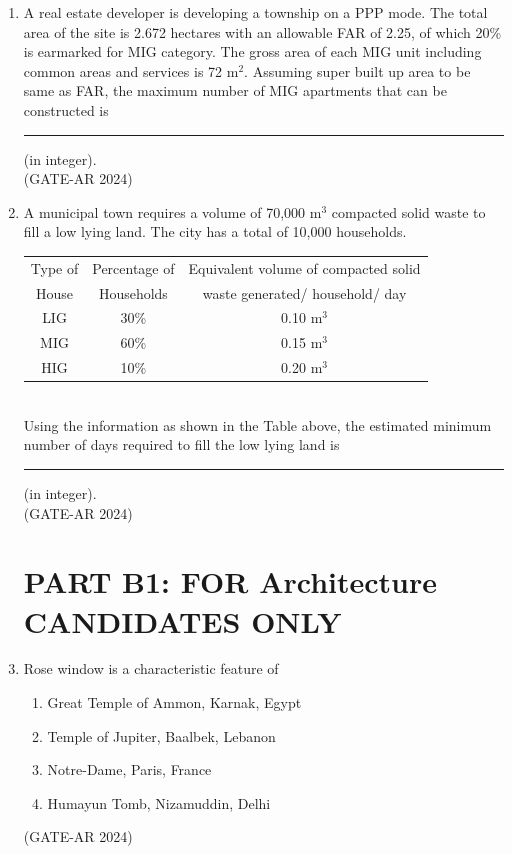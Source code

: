 \documentclass[a4paper,10pt]{article}
\begin{document}
\begin{enumerate}
    \item A real estate developer is developing a township on a PPP mode. The total area of the site is 2.672 hectares with an allowable FAR of 2.25, of which 20\% is earmarked for MIG category. The gross area of each MIG unit including common areas and services is 72 m$^2$. Assuming super built up area to be same as FAR, the maximum number of MIG apartments that can be constructed is \rule{2cm}{0.4pt} (in integer). \\
    \hfill (GATE-AR 2024)

    \item A municipal town requires a volume of 70,000 m$^3$ compacted solid waste to fill a low lying land. The city has a total of 10,000 households. \\
    \begin{tabular}{ | c | c | c | }
    \hline
    Type of & Percentage of & Equivalent volume of compacted solid \\
    House & Households & waste generated/ household/ day \\
    \hline
    LIG & 30\% & 0.10 m$^3$ \\
    \hline
    MIG & 60\% & 0.15 m$^3$ \\
    \hline
    HIG & 10\% & 0.20 m$^3$ \\
    \hline
    \end{tabular} \\
    Using the information as shown in the Table above, the estimated minimum number of days required to fill the low lying land is \rule{2cm}{0.4pt} (in integer). \\
    \hfill (GATE-AR 2024)

\section*{PART B1: FOR Architecture CANDIDATES ONLY}

    \item Rose window is a characteristic feature of
    \begin{enumerate}
        \item Great Temple of Ammon, Karnak, Egypt
        \item Temple of Jupiter, Baalbek, Lebanon
        \item Notre-Dame, Paris, France
        \item Humayun Tomb, Nizamuddin, Delhi
    \end{enumerate}
    \hfill (GATE-AR 2024)


\end{enumerate}
\end{document}
